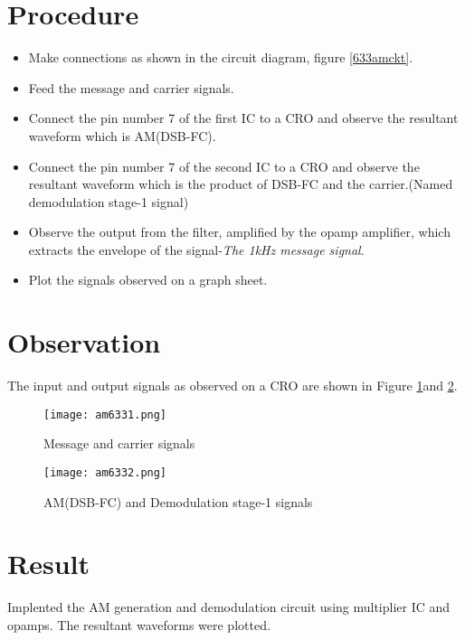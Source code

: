 \section*{Procedure}
\begin{itemize}
\item
Make connections as shown in the circuit diagram, figure \ref{633amckt}.
\item
Feed the message and carrier signals.
\item
Connect the pin number 7 of the first IC to a CRO and observe the resultant waveform which is AM(DSB-FC).
\item
Connect the pin number 7 of the second IC to a CRO and observe the resultant waveform which is the product of DSB-FC and the carrier.(Named demodulation stage-1 signal)
\item
Observe the output from the filter, amplified by the opamp amplifier, which extracts the envelope of the signal-\emph{The 1kHz message signal}.
\item
Plot the signals observed on a graph sheet.
\end{itemize}
\section*{Observation}
The input and output signals as observed on a CRO are shown in Figure \ref{AM633plot1}and \ref{AM633plot2}.
\begin{figure}
\texttt{[image: am6331.png]}
\caption{Message and carrier signals}
\label{AM633plot1}
\end{figure}

\begin{figure}
\texttt{[image: am6332.png]}
\caption{AM(DSB-FC) and Demodulation stage-1 signals}
\label{AM633plot2}
\end{figure}


\section*{Result}
Implented the AM generation and demodulation circuit using multiplier IC and opamps.
The resultant waveforms were plotted.